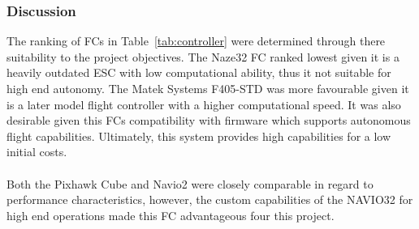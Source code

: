 \begin{table}[H]
\caption{Flight Controller Selection Matrix}
\label{tab:controller}
\end{table}
\subsubsection{Discussion}
The ranking of FCs in Table~\ref{tab:controller} were determined through there suitability to the project objectives. The Naze32 FC ranked lowest given it is a heavily outdated ESC with low computational ability, thus it not suitable for high end autonomy. The Matek Systems F405-STD was more favourable given it is a later model flight controller with a higher computational speed. It was also desirable given this FCs compatibility with firmware which supports autonomous flight capabilities. Ultimately, this system provides high capabilities for a low initial costs.\\
\\
Both the Pixhawk Cube and Navio2 were closely comparable in regard to performance characteristics, however, the custom capabilities of the NAVIO32 for high end operations made this FC advantageous four this project.

